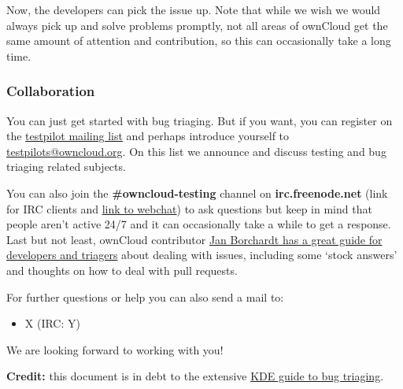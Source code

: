 \documentclass[letterpaper,10pt,english]{sphinxmanual}
\begin{document}
Now, the developers can pick the issue up. Note that while we wish we would always pick up and solve problems promptly, not all areas of ownCloud get the same amount of attention and contribution, so this can occasionally take a long time.


\subsubsection{Collaboration}
\label{bugtracker/triaging:collaboration}
You can just get started with bug triaging. But if you want, you can register on the \href{https://mailman.owncloud.org/mailman/listinfo/testpilots}{testpilot mailing list} and perhaps introduce yourself to \href{mailto:testpilots@owncloud.org}{testpilots@owncloud.org}. On this list we announce and discuss testing and bug triaging related subjects.

You can also join the \textbf{\#owncloud-testing} channel on \textbf{irc.freenode.net} (link for IRC clients and \href{https://webchat.freenode.net/}{link to webchat}) to ask questions but keep in mind that people aren't active 24/7 and it can occasionally take a while to get a response. Last but not least, ownCloud contributor \href{https://gist.github.com/jancborchardt/6155185}{Jan Borchardt has a great guide for developers and triagers} about dealing with issues, including some `stock answers' and thoughts on how to deal with pull requests.

For further questions or help you can also send a mail to:
\begin{itemize}
\item {} 
X (IRC: Y)

\end{itemize}

We are looking forward to working with you!

\textbf{Credit:} this document is in debt to the extensive \href{https://techbase.kde.org/Contribute/Bugsquad/Guide\_To\_BugTriaging}{KDE guide to bug triaging}.
\end{document}
